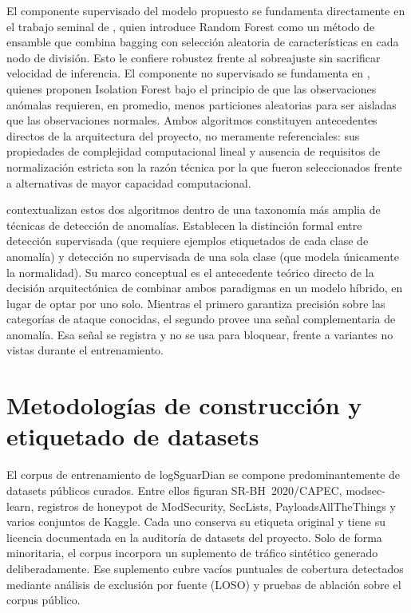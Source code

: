 El componente supervisado del modelo propuesto se fundamenta directamente en el trabajo seminal de \textcite{breiman2001}, quien introduce Random Forest como un método de ensamble que combina bagging con selección aleatoria de características en cada nodo de división. Esto le confiere robustez frente al sobreajuste sin sacrificar velocidad de inferencia. El componente no supervisado se fundamenta en \textcite{liu2008}, quienes proponen Isolation Forest bajo el principio de que las observaciones anómalas requieren, en promedio, menos particiones aleatorias para ser aisladas que las observaciones normales. Ambos algoritmos constituyen antecedentes directos de la arquitectura del proyecto, no meramente referenciales: sus propiedades de complejidad computacional lineal y ausencia de requisitos de normalización estricta son la razón técnica por la que fueron seleccionados frente a alternativas de mayor capacidad computacional.

\textcite{chandola2009} contextualizan estos dos algoritmos dentro de una taxonomía más amplia de técnicas de detección de anomalías. Establecen la distinción formal entre detección supervisada (que requiere ejemplos etiquetados de cada clase de anomalía) y detección no supervisada de una sola clase (que modela únicamente la normalidad). Su marco conceptual es el antecedente teórico directo de la decisión arquitectónica de combinar ambos paradigmas en un modelo híbrido, en lugar de optar por uno solo. Mientras el primero garantiza precisión sobre las categorías de ataque conocidas, el segundo provee una señal complementaria de anomalía. Esa señal se registra y no se usa para bloquear, frente a variantes no vistas durante el entrenamiento.

\section{Metodologías de construcción y etiquetado de datasets}

El corpus de entrenamiento de logSguarDian se compone predominantemente de datasets públicos curados. Entre ellos figuran SR-BH~2020/CAPEC\parencite{sureda2020srbh}, modsec-learn\parencite{scano2024modseclearn}, registros de honeypot de ModSecurity, SecLists, PayloadsAllTheThings y varios conjuntos de Kaggle. Cada uno conserva su etiqueta original y tiene su licencia documentada en la auditoría de datasets del proyecto. Solo de forma minoritaria, el corpus incorpora un suplemento de tráfico sintético generado deliberadamente. Ese suplemento cubre vacíos puntuales de cobertura detectados mediante análisis de exclusión por fuente (LOSO) y pruebas de ablación sobre el corpus público.


